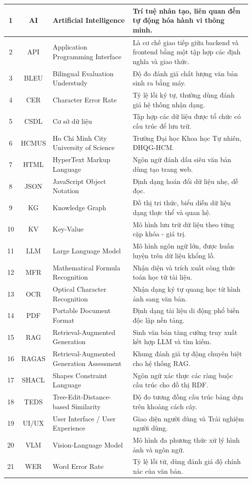 \begin{center}
\begin{longtable}{|c|c|p{5cm}|p{6cm}|}
		1 & AI & Artificial Intelligence & Trí tuệ nhân tạo, liên quan đến tự động hóa hành vi thông minh. \\ \hline
		2 & API & Application Programming Interface & Là cơ chế giao tiếp giữa backend và frontend bằng một tập hợp các định nghĩa và giao thức. \\ \hline
		3 & BLEU & Bilingual Evaluation Understudy & Độ đo đánh giá chất lượng văn bản sinh ra bằng máy. \\ \hline
		4 & CER & Character Error Rate & Tỷ lệ lỗi ký tự, thường dùng đánh giá hệ thống nhận dạng. \\ \hline
		5 & CSDL & Cơ sở dữ liệu & Tập hợp các dữ liệu được tổ chức có cấu trúc để lưu trữ. \\ \hline
		6 & HCMUS & Ho Chi Minh City University of Science & Trường Đại học Khoa học Tự nhiên, ĐHQG-HCM. \\ \hline
		7 & HTML & HyperText Markup Language & Ngôn ngữ đánh dấu siêu văn bản dùng tạo trang web. \\ \hline
		8 & JSON & JavaScript Object Notation & Định dạng hoán đổi dữ liệu nhẹ, dễ đọc. \\ \hline
		9 & KG & Knowledge Graph & Đồ thị tri thức, biểu diễn dữ liệu dạng thực thể và quan hệ. \\ \hline
		10 & KV & Key-Value & Mô hình lưu trữ dữ liệu theo từng cặp khóa - giá trị. \\ \hline
		11 & LLM & Large Language Model & Mô hình ngôn ngữ lớn, được huấn luyện trên dữ liệu khổng lồ. \\ \hline
		12 & MFR & Mathematical Formula Recognition & Nhận diện và trích xuất công thức toán học từ tài liệu. \\ \hline
		13 & OCR & Optical Character Recognition & Nhận dạng ký tự quang học từ hình ảnh sang văn bản. \\ \hline
		14 & PDF & Portable Document Format & Định dạng tài liệu di động phổ biến độc lập nền tảng. \\ \hline
		15 & RAG & Retrieval-Augmented Generation & Sinh văn bản tăng cường truy xuất kết hợp LLM và tìm kiếm. \\ \hline
		16 & RAGAS & Retrieval-Augmented Generation Assessment & Khung đánh giá tự động chuyên biệt cho hệ thống RAG. \\ \hline
		17 & SHACL & Shapes Constraint Language & Ngôn ngữ xác thực các ràng buộc cấu trúc cho đồ thị RDF. \\ \hline
		18 & TEDS & Tree-Edit-Distance-based Similarity & Độ đo tương đồng cấu trúc bảng dựa trên khoảng cách cây. \\ \hline
		19 & UI/UX & User Interface / User Experience & Giao diện người dùng và Trải nghiệm người dùng. \\ \hline
		20 & VLM & Vision-Language Model & Mô hình đa phương thức xử lý hình ảnh và ngôn ngữ. \\ \hline
		21 & WER & Word Error Rate & Tỷ lệ lỗi từ, dùng đánh giá độ chính xác của văn bản. \\ \hline
	\end{longtable}
\end{center}
